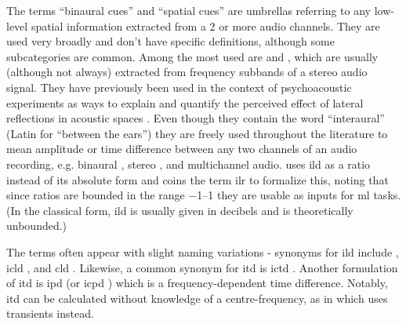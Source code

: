 \documentclass[referee,pdflatex,sn-mathphys-num]{sn-jnl}%
\newcommand{\q}[1]{\enquote{#1}}
\begin{document}
The terms \q{binaural cues} and \q{spatial cues} are umbrellas referring to any low-level spatial information extracted from a 2 or more audio channels. They are used very broadly and don't have specific definitions, although some subcategories are common. Among the most used are  and , which are usually (although not always) extracted from frequency subbands of a stereo audio signal. They have previously been used in the context of psychoacoustic experiments as ways to explain and quantify the perceived effect of lateral reflections in acoustic spaces \cite{lindemannEvaluationInterauralSignal1982,blauertAuditorySpaciousnessFurther1986}. Even though they contain the word \q{interaural} (Latin for \q{between the ears}) they are freely used throughout the literature to mean amplitude or time difference between any two channels of an audio recording, e.g. binaural \cite{choiObjectiveMeasurementPerceived2008}, stereo \cite{youSpatialLocalizationEvaluation2012}, and multichannel \cite{watcharasupatQuantifyingSpatialAudio2024} audio. \cite{barrySoundSourceSeparation2004} uses \gls{ild} as a ratio instead of its absolute form and \cite{barryBinaspectPythonLibrary2025} coins the term \gls{ilr} to formalize this, noting that since ratios are bounded in the range \numrange{-1}{1} they are usable as inputs for \gls{ml} tasks. (In the classical form, \gls{ild} is usually given in decibels and is theoretically unbounded.)

The terms often appear with slight naming variations - synonyms for \gls{ild} include  \cite{breebaartParametricCodingStereo2005,supperOnsetGuidedSpatialAnalyser2005,cobosStereoAudioSource2008,dewhirstModellingPerceivedSpatial2008}, \gls{icld} \cite{fallerBinauralCueCoding2002,beackAngleBasedVirtualSource2006,jangCenterChannelSeparation2008}, and \gls{cld} \cite{luthfiExperimentalStudyMPEG2018}.  Likewise, a common synonym for \gls{itd} is \gls{ictd} \cite{baumgarteEstimationAuditorySpatial2002,thompsonActiveMultichannelDownmix2009,hyunRobustInterchannelCorrelation2009}. Another formulation of \gls{itd} is \gls{ipd} \cite{fernandezEnhancingBinauralRendering2022,yeLAVSSLocationGuidedAudioVisual2024,serraMonotostereoParametricStereo2023} (or \gls{icpd} \cite{briandParametricCodingStereo2006}) which is a frequency-dependent time difference. Notably, \gls{itd} can be calculated without knowledge of a centre-frequency, as in \cite{youSpatialLocalizationEvaluation2012} which uses transients instead.
\end{document}
